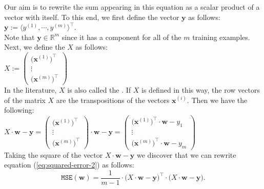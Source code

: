 Our aim is to rewrite the sum appearing in this equation as a scalar product of a vector with
itself.  To this end, we first define the vector $\mathbf{y}$ as follows:
\\[0.2cm]
\hspace*{1.3cm}
$\mathbf{y} := \langle y^{(1)}, \cdots, y^{(m)} \rangle^\top$.
\\[0.2cm]
Note that $\mathbf{y} \in \mathbb{R}^m$ since it has a component for all of the $m$ training
examples.  Next, we define the   $X$ as follows:
\\[0.2cm]
\hspace*{1.3cm}
$X := \left(
  \begin{array}{c}
    \bigl(\mathbf{x}^{(1)}\bigr)^\top  \\
    \vdots                         \\
    \bigl(\mathbf{x}^{(m)}\bigr)^\top
  \end{array}
  \right)   
$
\\[0.2cm]
In the literature, $X$ is also called the . 
If $X$ is defined in this way, the row vectors of the matrix $X$ are the transpositions of the vectors $\mathbf{x}^{(i)}$.
Then we have the following:
\\[0.2cm]
\hspace*{1.3cm}
$X \cdot \mathbf{w} - \mathbf{y} = \left(
  \begin{array}{c}
    \bigl(\mathbf{x}^{(1)}\bigr)^\top  \\
    \vdots                         \\
    \bigl(\mathbf{x}^{(m)}\bigr)^\top
  \end{array}
  \right) \cdot \mathbf{w} - \mathbf{y} = \left(
  \begin{array}{c}
    \bigl(\mathbf{x}^{(1)}\bigr)^\top \cdot \mathbf{w} - y_1 \\
    \vdots                         \\
    \bigl(\mathbf{x}^{(m)}\bigr)^\top \cdot \mathbf{w} - y_m
  \end{array}
  \right)
$
\\[0.2cm]
Taking the square of the vector $X \cdot \mathbf{w} - \mathbf{y}$ we discover that
we can rewrite equation (\ref{eq:squared-error-2}) as follows:
\begin{equation}
  \label{eq:squared-error-3}
  \mathtt{MSE}(\mathbf{w}) = \frac{1}{m-1} \cdot \bigl(X \cdot \mathbf{w} - \textbf{y}\bigr)^\top \cdot 
                                            \bigl(X \cdot \mathbf{w} - \textbf{y}\bigr).
\end{equation}

